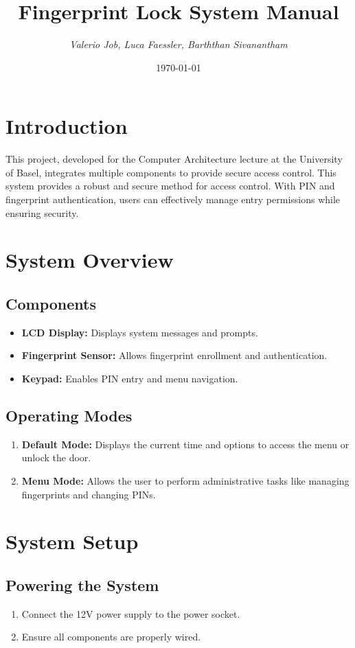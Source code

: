 \documentclass[a4paper,12pt]{article}
\title{\textbf{Fingerprint Lock System Manual}}
\author{\textit{Valerio Job, Luca Faessler, Barththan Sivanantham}}
\date{\today}
\begin{document}
\maketitle

\section{Introduction}
This project, developed for the Computer Architecture lecture at the University of Basel, integrates multiple components to provide secure access control. This system provides a robust and secure method for access control. With PIN and fingerprint authentication, users can effectively manage entry permissions while ensuring security.

\section{System Overview}
\subsection{Components}
\begin{itemize}
    \item \textbf{LCD Display:} Displays system messages and prompts.
    \item \textbf{Fingerprint Sensor:} Allows fingerprint enrollment and authentication.
    \item \textbf{Keypad:} Enables PIN entry and menu navigation.
\end{itemize}

\subsection{Operating Modes}
\begin{enumerate}
    \item \textbf{Default Mode:} Displays the current time and options to access the menu or unlock the door.
    \item \textbf{Menu Mode:} Allows the user to perform administrative tasks like managing fingerprints and changing PINs.
\end{enumerate}

\section{System Setup}
\subsection{Powering the System}
\begin{enumerate}
    \item Connect the 12V power supply to the power socket.
    \item Ensure all components are properly wired.
\end{enumerate}
\end{document}
